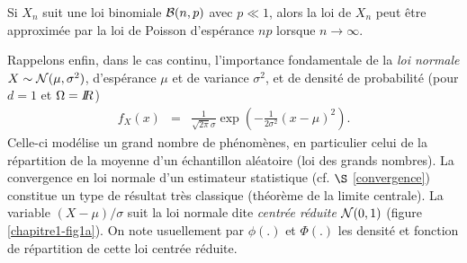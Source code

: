 \begin{lemmo}
Si $X_n$ suit une loi binomiale ${\cal{B}}(n,p)$ avec $p\ll 1$, alors la loi de $X_n$ peut \^etre approxim\'ee par la loi de Poisson d'esp\'erance $np$ lorsque $n\to\infty$. \\
\end{lemmo}


Rappelons enfin, dans le cas continu, l'importance fondamentale de la {\it loi normale} $X\sim {\cal{N}}(\mu,\sigma^2)$,  d'esp\'erance $\mu$ et de variance $\sigma^2$, et de densit\'e de probabilit\'e (pour $d=1$ et $\Omega=I\!\!R$) 
\begin{eqnarray*}
f_X(x) & = & \frac{1}{\sqrt{2\pi}\sigma} \exp\left(-\frac{1}{2\sigma^2}(x-\mu)^2 \right).
\end{eqnarray*}
Celle-ci mod\'elise un grand nombre de ph\'enom\`enes, en particulier celui de la r\'epartition de la moyenne d'un \'echantillon al\'eatoire (loi des grands nombres).   La convergence en loi  normale d'un estimateur statistique (cf. $\S$ \ref{convergence}) constitue un type de r\'esultat tr\`es classique (th\'eor\`eme de la limite centrale). 
La variable $(X-\mu)/\sigma$ suit la loi normale dite {\it centr\'ee r\'eduite} ${\cal{N}}(0,1)$ (figure \ref{chapitre1-fig1a}). On note usuellement par $\phi(.)$ et $\Phi(.)$ les densit\'e et fonction de r\'epartition de cette loi centr\'ee r\'eduite. \\


